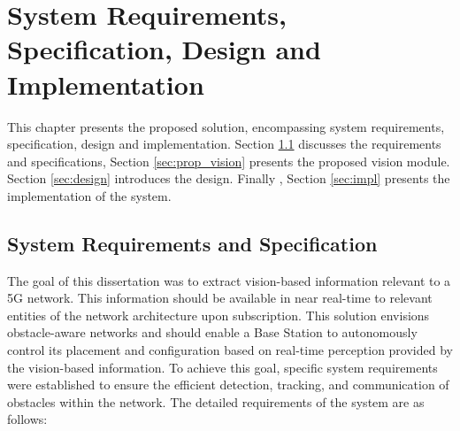\chapter{System Requirements, Specification, Design and Implementation}\label{ch:specs_design_implem}

This chapter presents the proposed solution, encompassing system requirements, specification, design and implementation. Section \ref{sec:specs} discusses the requirements and specifications, Section \ref{sec:prop_vision} presents the proposed vision module. Section \ref{sec:design} introduces the design. Finally , Section \ref{sec:impl} presents the implementation of the system.

\section{System Requirements and Specification}\label{sec:specs}
The goal of this dissertation was to extract vision-based information relevant to a 5G network.
This information should be available in near real-time to relevant entities of the network architecture upon subscription.
This solution envisions obstacle-aware networks and should enable a Base Station to autonomously control its placement and configuration based on real-time perception provided by the vision-based information. To achieve this goal, specific system requirements were established to ensure the efficient detection, tracking, and communication of obstacles within the network. The detailed requirements of the system are as follows:


